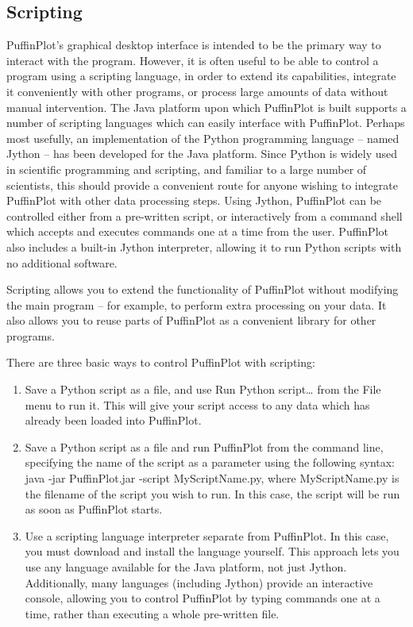 \documentclass[a4paper,british]{article}
\newcommand{\ppcmd}[1]{\textsf{#1}} %
\begin{document}
\subsection{\label{sec:scripting}Scripting}

PuffinPlot's graphical desktop interface is intended to be the primary way to
interact with the program. However, it is often useful to be able to control
a program using a scripting language, in order to extend its capabilities,
integrate it conveniently with other programs, or process large amounts of
data without manual intervention. The Java platform upon which PuffinPlot is
built supports a number of scripting languages which can easily interface
with PuffinPlot. Perhaps most usefully, an implementation of the Python
programming language -- named Jython \citep{juneau2009jython} -- has been
developed for the Java platform. Since Python is widely used in scientific
programming and scripting, and familiar to a large number of scientists, this
should provide a convenient route for anyone wishing to integrate PuffinPlot
with other data processing steps. Using Jython, PuffinPlot can be controlled
either from a pre-written script, or interactively from a command shell which
accepts and executes commands one at a time from the user. PuffinPlot also
includes a built-in Jython interpreter, allowing it to run Python scripts
with no additional software.

Scripting allows you to extend the functionality of PuffinPlot without
modifying the main program -- for example, to perform extra processing on
your data. It also allows you to reuse parts of PuffinPlot as a convenient
library for other programs.

There are three basic ways to control PuffinPlot with scripting:

\begin{enumerate}

\item Save a Python script as a file, and use \ppcmd{Run Python script\ldots}
  from the \ppcmd{File} menu to run it. This will give your script access to
  any data which has already been loaded into PuffinPlot.

\item Save a Python script as a file and run PuffinPlot from the command
  line, specifying the name of the script as a parameter using the following
  syntax: \ppcmd{java -jar PuffinPlot.jar -script MyScriptName.py}, where
  \ppcmd{MyScriptName.py} is the filename of the script you wish to run.
  In this case, the script will be run as soon as PuffinPlot starts.

\item Use a scripting language interpreter separate from PuffinPlot. In this
  case, you must download and install the language yourself. This approach
  lets you use any language available for the Java platform, not just Jython.
  Additionally, many languages (including Jython) provide an interactive
  console, allowing you to control PuffinPlot by typing commands one at a
  time, rather than executing a whole pre-written file.

\end{enumerate}
\end{document}
